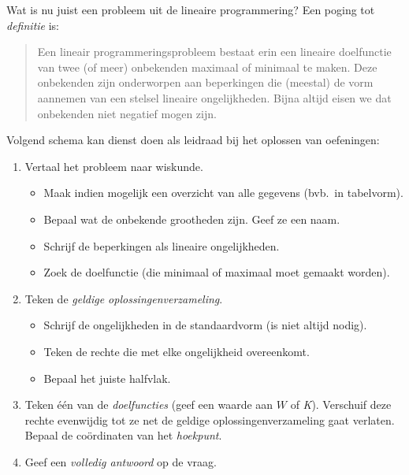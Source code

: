 Wat is nu juist een probleem uit de lineaire programmering? Een
poging tot \emph{definitie} is:

\begin{quote}
    Een lineair programmeringsprobleem bestaat erin een lineaire
doelfunctie van twee (of meer) onbekenden maximaal of minimaal
te maken. Deze onbekenden zijn onderworpen aan beperkingen die
(meestal)
de vorm aannemen van een stelsel lineaire ongelijkheden. Bijna
altijd eisen we dat onbekenden niet negatief mogen zijn.
\end{quote}

Volgend schema kan dienst doen als leidraad bij het oplossen
van oefeningen:

\begin{enumerate}
    \item  Vertaal het probleem naar wiskunde.
    \begin{itemize}
        \item  Maak indien mogelijk een overzicht van alle gegevens (bvb.\ in tabelvorm).

        \item  Bepaal wat de onbekende grootheden zijn. Geef ze
een naam.

        \item  Schrijf de beperkingen als lineaire ongelijkheden.

        \item  Zoek de doelfunctie (die minimaal of maximaal moet gemaakt
worden).
    \end{itemize}

    \item  Teken de \emph{geldige oplossingenverzameling}.
    \begin{itemize}
        \item  Schrijf de ongelijkheden in de standaardvorm (is
niet altijd nodig).

        \item  Teken de rechte die met elke ongelijkheid overeenkomt.

        \item  Bepaal het juiste halfvlak.
    \end{itemize}

    \item  Teken \'{e}\'{e}n van de \emph{doelfuncties} (geef een waarde
    aan $W$
of \emph{K}). Verschuif deze rechte evenwijdig tot ze net de geldige
oplossingenverzameling gaat verlaten. Bepaal  de co\"{o}rdinaten van het \emph{hoekpunt}.

    \item  Geef een \emph{volledig antwoord} op de vraag.
\end{enumerate}


